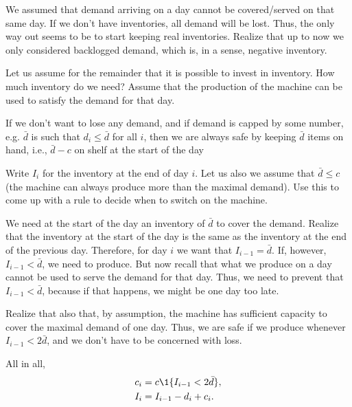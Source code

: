   \begin{solution}
    We assumed that demand arriving on a day cannot be covered/served
    on that same day. If we don't have inventories, all demand will be
    lost. Thus, the only way out seems to be to start keeping real
    inventories. Realize that up to now we only considered backlogged
    demand, which is, in a sense, negative inventory.
  \end{solution}

\begin{question}
  Let us assume for the remainder that it is possible to invest in
  inventory. How much inventory do we need? Assume that the production
  of the machine can be used to satisfy the demand for that day. 
\end{question}

  \begin{solution}
    If we don't want to lose any demand, and if demand is capped by
    some number, e.g.  $\bar d$ is such that $d_i \leq \bar d$ for all
    $i$, then we are always safe by keeping $\bar d$ items on hand,
    i.e., $\bar d-c$ on shelf at the start of the day
  \end{solution}

\begin{question}
  Write $I_i$ for the inventory at the end of day $i$.  
  Let us also we assume that $\bar d \leq c$ (the machine can
  always produce more than the maximal demand).  Use this to come up
  with a rule to decide when to switch on the machine.
\end{question}

  \begin{solution}
    We need at the start of the day an inventory of $\bar d$ to cover
    the demand. Realize that the inventory at the start of the day is
    the same as the inventory at the end of the previous
    day. Therefore, for day $i$ we want that $I_{i-1} = \bar d$. If,
    however, $I_{i-1}<\bar d$, we need to produce. But now recall that
    what we produce on a day cannot be used to serve the demand for
    that day. Thus, we need to prevent that $I_{i-1}<\bar d$, because
    if that happens, we might be one day too late.

    Realize that also that, by assumption, the machine has sufficient
    capacity to cover the maximal demand of one day. Thus, we are safe
    if we produce whenever $I_{i-1} <2 \bar d$, and we don't have to
    be concerned with loss.  

All in all, 
    \begin{align*}
      c_i &= c \1{I_{i-1}< 2\bar d}, \\
      I_i &= I_{i-1} -d_i + c_i. 
    \end{align*}
  \end{solution}


